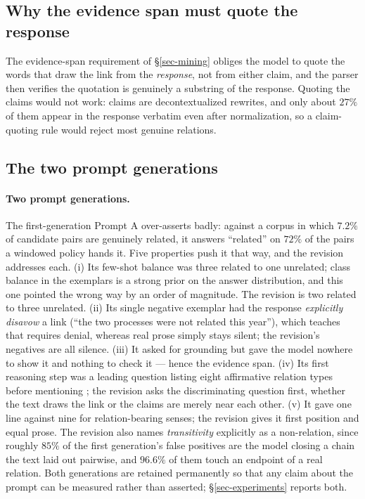 \subsection{Why the evidence span must quote the response}

The evidence-span requirement of \S\ref{sec-mining} obliges the model to quote the words that draw the link
from the \emph{response}, not from either claim, and the parser then verifies the quotation is genuinely a
substring of the response. Quoting the claims would not work: claims are decontextualized rewrites, and only
about $27\%$ of them appear in the response verbatim even after normalization, so a claim-quoting rule would
reject most genuine relations.

\subsection{The two prompt generations}

\paragraph{Two prompt generations.} The first-generation Prompt A over-asserts badly: against a
corpus in which $7.2\%$ of candidate pairs are genuinely related, it answers ``related'' on $72\%$ of
the pairs a windowed policy hands it. Five properties push it that way, and the revision addresses
each. (i) Its few-shot balance was three related to one unrelated; class balance in the exemplars is
a strong prior on the answer distribution, and this one pointed the wrong way by an order of
magnitude. The revision is two related to three unrelated. (ii) Its single negative exemplar had the
response \emph{explicitly disavow} a link (``the two processes were not related this year''), which
teaches that  requires denial, whereas real prose simply stays silent; the revision's
negatives are all silence. (iii) It asked for grounding but gave the model nowhere to show it and
nothing to check it --- hence the evidence span. (iv) Its first reasoning step was a leading question
listing eight affirmative relation types before mentioning ; the revision asks the
discriminating question first, whether the text draws the link or the claims are merely near each
other. (v) It gave  one line against nine for relation-bearing senses; the revision
gives it first position and equal prose. The revision also names \emph{transitivity} explicitly as a
non-relation, since roughly $85\%$ of the first generation's false positives are the model closing a
chain the text laid out pairwise, and $96.6\%$ of them touch an endpoint of a real relation. Both
generations are retained permanently so that any claim about the prompt can be measured rather than
asserted; \S\ref{sec-experiments} reports both.


